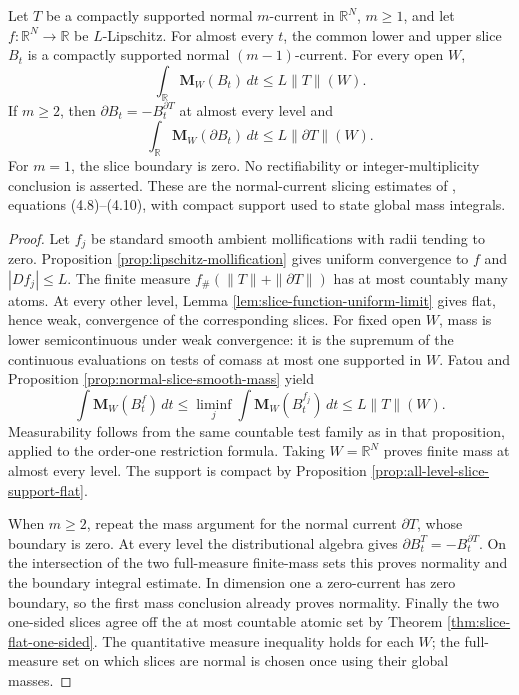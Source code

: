 \begin{theorem}\label{thm:normal-lipschitz-slicing}
Let $T$ be a compactly supported normal $m$-current in $\mathbb R^N$, $m\geq1$, and let $f:\mathbb R^N\to\mathbb R$ be $L$-Lipschitz. For almost every $t$, the common lower and upper slice $B_t$ is a compactly supported normal $(m-1)$-current. For every open $W$,
\[
 \int_{\mathbb R}\mathbf M_W(B_t)\,dt\leq L\|T\|(W).
\]
If $m\geq2$, then $\partial B_t=-B_t^{\partial T}$ at almost every level and
\[
 \int_{\mathbb R}\mathbf M_W(\partial B_t)\,dt
 \leq L\|\partial T\|(W).
\]
For $m=1$, the slice boundary is zero. No rectifiability or integer-multiplicity conclusion is asserted. These are the normal-current slicing estimates of \cite{Sim18}, equations (4.8)--(4.10), with compact support used to state global mass integrals.
\end{theorem}
\begin{proof}
Let $f_j$ be standard smooth ambient mollifications with radii tending to zero. Proposition \ref{prop:lipschitz-mollification} gives uniform convergence to $f$ and $|Df_j|\leq L$. The finite measure $f_\#(\|T\|+\|\partial T\|)$ has at most countably many atoms. At every other level, Lemma \ref{lem:slice-function-uniform-limit} gives flat, hence weak, convergence of the corresponding slices. For fixed open $W$, mass is lower semicontinuous under weak convergence: it is the supremum of the continuous evaluations on tests of comass at most one supported in $W$. Fatou and Proposition \ref{prop:normal-slice-smooth-mass} yield
\[
 \int\mathbf M_W(B_t^f)\,dt
 \leq\liminf_j\int\mathbf M_W(B_t^{f_j})\,dt
 \leq L\|T\|(W).
\]
Measurability follows from the same countable test family as in that proposition, applied to the order-one restriction formula. Taking $W=\mathbb R^N$ proves finite mass at almost every level. The support is compact by Proposition \ref{prop:all-level-slice-support-flat}.

When $m\geq2$, repeat the mass argument for the normal current $\partial T$, whose boundary is zero. At every level the distributional algebra gives $\partial B_t^T=-B_t^{\partial T}$. On the intersection of the two full-measure finite-mass sets this proves normality and the boundary integral estimate. In dimension one a zero-current has zero boundary, so the first mass conclusion already proves normality. Finally the two one-sided slices agree off the at most countable atomic set by Theorem \ref{thm:slice-flat-one-sided}. The quantitative measure inequality holds for each $W$; the full-measure set on which slices are normal is chosen once using their global masses.
\end{proof}


